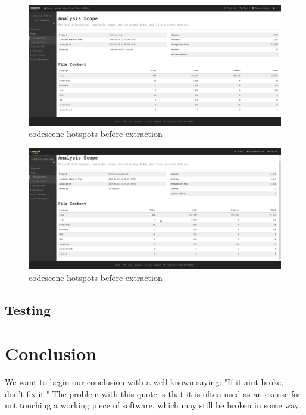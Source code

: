 \documentclass{article}
\begin{document}
\begin{figure}[H]
\centering
	\includegraphics[width=\textwidth]{codescene/small/analysis_scope_before.png}
	\caption{codescene hotspots before extraction}
\end{figure}

\begin{figure}[H]
\centering
	\includegraphics[width=\textwidth]{codescene/small/analysis_scope_after.png}
	\caption{codescene hotspots before extraction}
\end{figure}


\subsection{Testing}


\newpage
\section{Conclusion}

We want to begin our conclusion with a well known saying: "If it aint broke, don't fix it." The problem with this quote is that it is often used as an excuse for not touching a working piece of software, which may still be broken in some way.\cite{mps}\\ 
\end{document}
